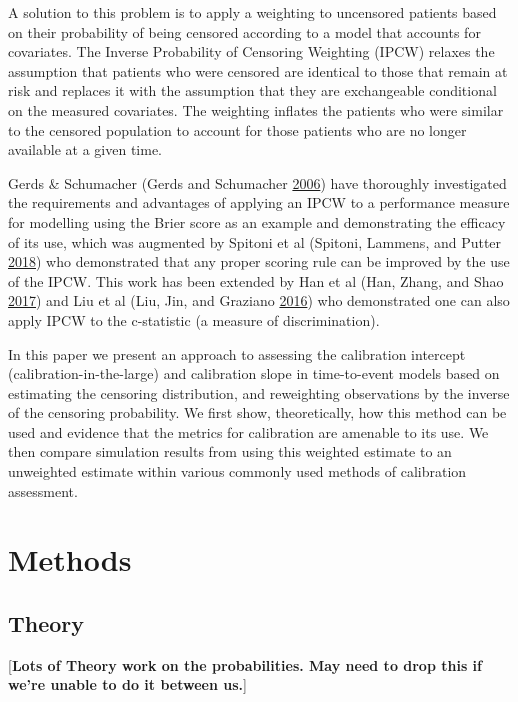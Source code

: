 \documentclass[
]{article}
\begin{document}
A solution to this problem is to apply a weighting to uncensored patients based on their probability of being censored according to a model that accounts for covariates. The Inverse Probability of Censoring Weighting (IPCW) relaxes the assumption that patients who were censored are identical to those that remain at risk and replaces it with the assumption that they are exchangeable conditional on the measured covariates. The weighting inflates the patients who were similar to the censored population to account for those patients who are no longer available at a given time.

Gerds \& Schumacher (Gerds and Schumacher \protect\hyperlink{ref-gerds_consistent_2006}{2006}) have thoroughly investigated the requirements and advantages of applying an IPCW to a performance measure for modelling using the Brier score as an example and demonstrating the efficacy of its use, which was augmented by Spitoni et al (Spitoni, Lammens, and Putter \protect\hyperlink{ref-spitoni_prediction_2018}{2018}) who demonstrated that any proper scoring rule can be improved by the use of the IPCW. This work has been extended by Han et al (Han, Zhang, and Shao \protect\hyperlink{ref-han_comparing_2017}{2017}) and Liu et al (Liu, Jin, and Graziano \protect\hyperlink{ref-liu_comparing_2016}{2016}) who demonstrated one can also apply IPCW to the c-statistic (a measure of discrimination).

In this paper we present an approach to assessing the calibration intercept (calibration-in-the-large) and calibration slope in time-to-event models based on estimating the censoring distribution, and reweighting observations by the inverse of the censoring probability. We first show, theoretically, how this method can be used and evidence that the metrics for calibration are amenable to its use. We then compare simulation results from using this weighted estimate to an unweighted estimate within various commonly used methods of calibration assessment.

\hypertarget{methods-1}{%
\section{Methods}\label{methods-1}}

\hypertarget{theory}{%
\subsection{Theory}\label{theory}}

{[}\textbf{Lots of Theory work on the probabilities. May need to drop this if we're unable to do it between us.}{]}
\end{document}
